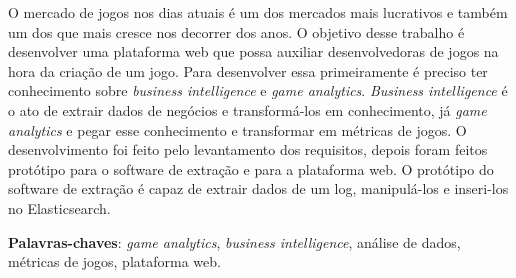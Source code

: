 \begin{resumo}
O mercado de jogos nos dias atuais é um dos mercados mais lucrativos e também um dos que mais cresce nos decorrer dos anos. O objetivo desse trabalho é desenvolver uma plataforma web que possa auxiliar desenvolvedoras de jogos na hora da criação de um jogo. Para desenvolver essa primeiramente é preciso ter conhecimento sobre \textit{business intelligence} e \textit{game analytics}. \textit{Business intelligence} é o ato de extrair dados de negócios e transformá-los em conhecimento, já \textit{game analytics} e pegar esse conhecimento e transformar em métricas de jogos. O desenvolvimento foi feito pelo levantamento dos requisitos, depois foram feitos protótipo para o software de extração e para a plataforma web. O protótipo do software de extração é capaz de extrair dados de um log, manipulá-los e inseri-los no Elasticsearch.

\vspace{\onelineskip}
    
\noindent
\textbf{Palavras-chaves}: \textit{game analytics}, \textit{business intelligence}, análise de dados, métricas de jogos, plataforma web.
\end{resumo}
